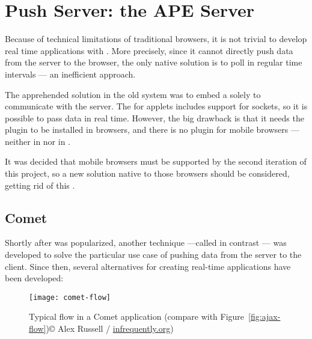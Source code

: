 \section{Push Server: the APE Server} %
\label{sec:ape}

Because of technical limitations of traditional browsers, it is not trivial to develop real time applications with .
More precisely, since it cannot directly push data from the server to the browser, the only native solution is to poll in regular time intervals --- an inefficient approach.

The apprehended solution in the old system was to embed a  solely to communicate with the server.
The   for applets includes support for sockets, so it is possible to pass data in real time.
However, the big drawback is that it needs the  plugin to be installed in browsers, and there is no plugin for mobile browsers --- neither in  nor in .

It was decided that mobile browsers must be supported by the second iteration of this project, so a new solution native to those browsers should be considered, getting rid of this .

\subsection{Comet} %
\label{sub:comet}

Shortly after  was popularized, another technique ---called in contrast --- was developed to solve the particular use case of pushing data from the server to the client.
Since then, several alternatives for creating real-time applications have been developed:

\begin{figure}[htbp]
  \centering
    \texttt{[image: comet-flow]}
  \caption[Comet flow]{Typical flow in a Comet application (compare with Figure~\vref{fig:ajax-flow})\newline© Alex Russell / \url{infrequently.org})}
  \label{fig:comet-flow}
\end{figure}


